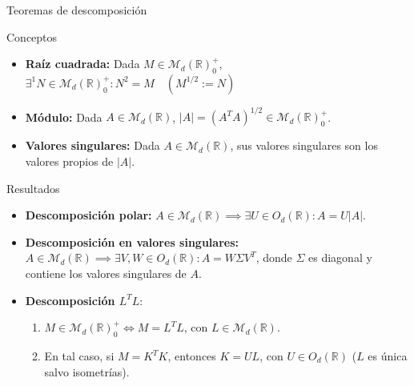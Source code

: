 \documentclass[10pt, compress]{beamer}
\newcommand\R{\mathbb{R}}
\begin{document}
\begin{frame}[shrink]{Teoremas de descomposición}
  \begin{block}{Conceptos}
    \begin{itemize}
      \item \textbf{Raíz cuadrada: } Dada $M \in \mathcal{M}_d(\R)^+_0$, $\exists^1 N \in \mathcal{M}_d(\R)^+_0 \colon N^2 = M \quad (M^{1/2} := N)$
      \item \textbf{Módulo: } Dada $A \in \mathcal{M}_d(\R)$, $|A| = (A^TA)^{1/2} \in \mathcal{M}_d(\R)^+_0$.
      \item \textbf{Valores singulares: } Dada $A \in \mathcal{M}_d(\R)$, sus valores singulares son los valores propios de $|A|$.
    \end{itemize}
  \end{block}

  \begin{alertblock}{Resultados}
    \begin{itemize}
      \item \textbf{Descomposición polar: } $A \in \mathcal{M}_d(\R) \implies \exists U \in O_d(\R) \colon A = U|A|$.
      \item \textbf{Descomposición en valores singulares: } $A \in \mathcal{M}_d(\R) \implies \exists V, W \in O_d(\R) \colon A = W\Sigma V^T$, donde $\Sigma$ es diagonal y contiene los valores singulares de $A$.
      \item \textbf{Descomposición $L^TL$}:
      \begin{enumerate}
        \item $M \in \mathcal{M}_d(\R)^+_0 \iff M = L^TL$, con $L \in \mathcal{M}_d(\R)$.
        \item En tal caso, si $M = K^TK$, entonces $K = UL$, con $U \in O_d(\R)$ ($L$ es única salvo isometrías).
      \end{enumerate}
    \end{itemize}
  \end{alertblock}
\end{frame}
\end{document}
